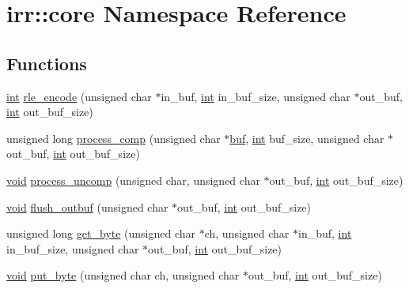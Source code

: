 \hypertarget{namespaceirr_1_1core}{\section{irr\-:\-:core Namespace Reference}
\label{namespaceirr_1_1core}
}
\subsection*{Functions}
\begin{DoxyCompactItemize}
\item 
\hyperlink{wglext_8h_a500a82aecba06f4550f6849b8099ca21}{int} \hyperlink{namespaceirr_1_1core_adf1a59061c12fe75f1ab6e07d5156d2d}{rle\-\_\-encode} (unsigned char $\ast$in\-\_\-buf, \hyperlink{wglext_8h_a500a82aecba06f4550f6849b8099ca21}{int} in\-\_\-buf\-\_\-size, unsigned char $\ast$out\-\_\-buf, \hyperlink{wglext_8h_a500a82aecba06f4550f6849b8099ca21}{int} out\-\_\-buf\-\_\-size)
\item 
unsigned long \hyperlink{namespaceirr_1_1core_ab428493e126e7af63ff35e298303b232}{process\-\_\-comp} (unsigned char $\ast$\hyperlink{glext_8h_aa3b73d9ca9f2e2396cbeae1ce6ce14be}{buf}, \hyperlink{wglext_8h_a500a82aecba06f4550f6849b8099ca21}{int} buf\-\_\-size, unsigned char $\ast$out\-\_\-buf, \hyperlink{wglext_8h_a500a82aecba06f4550f6849b8099ca21}{int} out\-\_\-buf\-\_\-size)
\item 
\hyperlink{wglext_8h_a9e6b7f1933461ef318bb000d6bd13b83}{void} \hyperlink{namespaceirr_1_1core_a18f2fcccee4ea7a302baf3e32835d06a}{process\-\_\-uncomp} (unsigned char, unsigned char $\ast$out\-\_\-buf, \hyperlink{wglext_8h_a500a82aecba06f4550f6849b8099ca21}{int} out\-\_\-buf\-\_\-size)
\item 
\hyperlink{wglext_8h_a9e6b7f1933461ef318bb000d6bd13b83}{void} \hyperlink{namespaceirr_1_1core_a5ce2643d3cf17bdd6a0ceec8924a4357}{flush\-\_\-outbuf} (unsigned char $\ast$out\-\_\-buf, \hyperlink{wglext_8h_a500a82aecba06f4550f6849b8099ca21}{int} out\-\_\-buf\-\_\-size)
\item 
unsigned long \hyperlink{namespaceirr_1_1core_a930c188a4512fb9475621d77ab953e0b}{get\-\_\-byte} (unsigned char $\ast$ch, unsigned char $\ast$in\-\_\-buf, \hyperlink{wglext_8h_a500a82aecba06f4550f6849b8099ca21}{int} in\-\_\-buf\-\_\-size, unsigned char $\ast$out\-\_\-buf, \hyperlink{wglext_8h_a500a82aecba06f4550f6849b8099ca21}{int} out\-\_\-buf\-\_\-size)
\item 
\hyperlink{wglext_8h_a9e6b7f1933461ef318bb000d6bd13b83}{void} \hyperlink{namespaceirr_1_1core_a3876647adcc4e06128c5383a6217e5ee}{put\-\_\-byte} (unsigned char ch, unsigned char $\ast$out\-\_\-buf, \hyperlink{wglext_8h_a500a82aecba06f4550f6849b8099ca21}{int} out\-\_\-buf\-\_\-size)

\end{DoxyCompactItemize}
